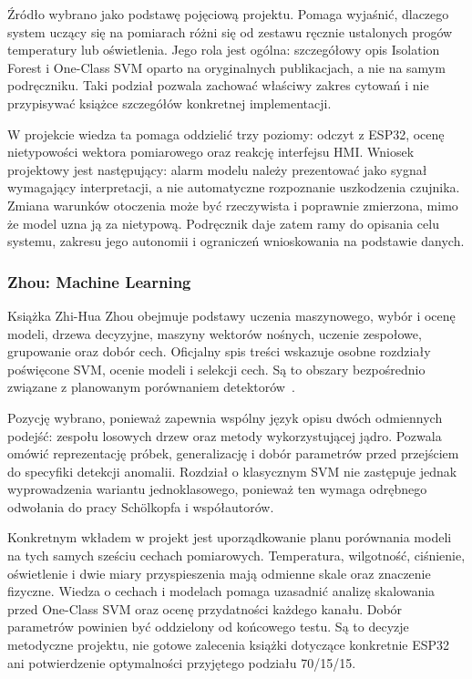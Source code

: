 \documentclass[12pt,a4paper]{article}
\begin{document}
Źródło wybrano jako podstawę pojęciową projektu. Pomaga wyjaśnić, dlaczego
system uczący się na pomiarach różni się od zestawu ręcznie ustalonych progów
temperatury lub oświetlenia. Jego rola jest ogólna: szczegółowy opis Isolation
Forest i One-Class SVM oparto na oryginalnych publikacjach, a nie na samym
podręczniku. Taki podział pozwala zachować właściwy zakres cytowań i nie
przypisywać książce szczegółów konkretnej implementacji.

W projekcie wiedza ta pomaga oddzielić trzy poziomy: odczyt z ESP32, ocenę
nietypowości wektora pomiarowego oraz reakcję interfejsu HMI. Wniosek projektowy
jest następujący: alarm modelu należy prezentować jako sygnał wymagający
interpretacji, a nie automatyczne rozpoznanie uszkodzenia czujnika. Zmiana
warunków otoczenia może być rzeczywista i poprawnie zmierzona, mimo że model
uzna ją za nietypową. Podręcznik daje zatem ramy do opisania celu systemu,
zakresu jego autonomii i ograniczeń wnioskowania na podstawie danych.

\subsubsection{Zhou: Machine Learning}
Książka Zhi-Hua Zhou obejmuje podstawy uczenia maszynowego, wybór i ocenę
modeli, drzewa decyzyjne, maszyny wektorów nośnych, uczenie zespołowe,
grupowanie oraz dobór cech. Oficjalny spis treści wskazuje osobne rozdziały
poświęcone SVM, ocenie modeli i selekcji cech. Są to obszary bezpośrednio
związane z planowanym porównaniem detektorów~\cite{zhou2021}. 

Pozycję wybrano, ponieważ zapewnia wspólny język opisu dwóch odmiennych
podejść: zespołu losowych drzew oraz metody wykorzystującej jądro.
Pozwala omówić reprezentację próbek, generalizację i dobór parametrów przed
przejściem do specyfiki detekcji anomalii. Rozdział o klasycznym SVM nie
zastępuje jednak wyprowadzenia wariantu jednoklasowego, ponieważ ten wymaga odrębnego
odwołania do pracy Schölkopfa i współautorów.

Konkretnym wkładem w projekt jest uporządkowanie planu porównania modeli
na tych samych sześciu cechach pomiarowych. Temperatura, wilgotność, ciśnienie,
oświetlenie i dwie miary przyspieszenia mają odmienne skale oraz znaczenie
fizyczne. Wiedza o cechach i modelach pomaga uzasadnić analizę skalowania
przed One-Class SVM oraz ocenę przydatności każdego kanału. Dobór parametrów
powinien być oddzielony od końcowego testu. Są to decyzje metodyczne projektu,
nie gotowe zalecenia książki dotyczące konkretnie ESP32 ani potwierdzenie
optymalności przyjętego podziału 70/15/15.
\end{document}
